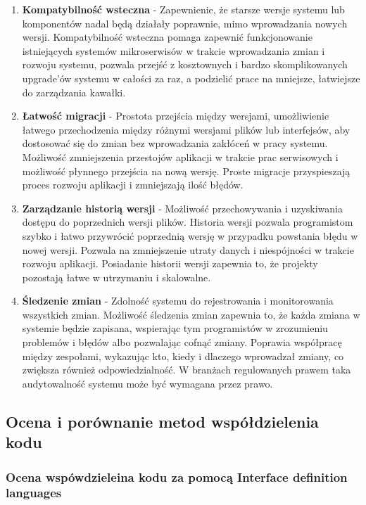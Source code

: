 \documentclass[runningheads,12pt]{llncs}
\begin{document}
\begin{enumerate}
    \item \textbf{Kompatybilność wsteczna} - Zapewnienie, że starsze wersje systemu lub komponentów nadal będą działały poprawnie, mimo wprowadzania nowych wersji. Kompatybilność wsteczna pomaga zapewnić funkcjonowanie istniejących systemów mikroserwisów w trakcie wprowadzania zmian i rozwoju systemu, pozwala przejść z kosztownych i bardzo skomplikowanych upgrade'ów systemu w całości za raz, a podzielić prace na mniejsze, łatwiejsze do zarządzania kawałki.  ~\cite[p. 75]{bloch2018effective}
    \item \textbf{Łatwość migracji} - Prostota przejścia między wersjami, umożliwienie łatwego przechodzenia między różnymi wersjami plików lub interfejsów, aby dostosować się do zmian bez wprowadzania zakłóceń w pracy systemu. Możliwość zmniejszenia przestojów aplikacji w trakcie prac serwisowych i możliwość płynnego przejścia na nową wersję. Proste migracje przyspieszają proces rozwoju aplikacji i zmniejszają ilość błędów. ~\cite[p. 78]{bloch2018effective}
    \item \textbf{Zarządzanie historią wersji} - Możliwość przechowywania i uzyskiwania dostępu do poprzednich wersji plików. Historia wersji pozwala programistom szybko i łatwo przywrócić poprzednią wersję w przypadku powstania błędu w nowej wersji. Pozwala na zmniejszenie utraty danych i niespójności w trakcie rozwoju aplikacji. Posiadanie historii wersji zapewnia to, że projekty pozostają łatwe w utrzymaniu i skalowalne. ~\cite[p. 150]{rubin2012essential}
    \item \textbf{Śledzenie zmian} - Zdolność systemu do rejestrowania i monitorowania wszystkich zmian. Możliwość śledzenia zmian zapewnia to, że każda zmiana w systemie będzie zapisana, wspierając tym programistów w zrozumieniu problemów i błędów albo pozwalając cofnąć zmiany. Poprawia współpracę między zespołami, wykazując kto, kiedy i dlaczego wprowadzał zmiany, co zwiększa również odpowiedzialność. W branżach regulowanych prawem taka audytowalność systemu może być wymagana przez prawo. ~\cite[p. 150]{rubin2012essential}
\end{enumerate}

\subsection{Ocena i porównanie metod współdzielenia kodu}

\subsubsection{Ocena wspówdzieleina kodu za pomocą Interface definition languages}
\end{document}
